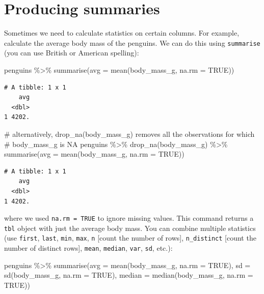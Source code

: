 \documentclass[
  letterpaper,
  DIV=11,
  numbers=noendperiod]{scrreprt}
\newenvironment{Shaded}{\begin{snugshade}}{\end{snugshade}}
\newcommand{\AttributeTok}[1]{\textcolor[rgb]{0.40,0.45,0.13}{#1}}
\newcommand{\CommentTok}[1]{\textcolor[rgb]{0.37,0.37,0.37}{#1}}
\newcommand{\ConstantTok}[1]{\textcolor[rgb]{0.56,0.35,0.01}{#1}}
\newcommand{\FunctionTok}[1]{\textcolor[rgb]{0.28,0.35,0.67}{#1}}
\newcommand{\NormalTok}[1]{\textcolor[rgb]{0.00,0.23,0.31}{#1}}
\newcommand{\SpecialCharTok}[1]{\textcolor[rgb]{0.37,0.37,0.37}{#1}}
\begin{document}
\hypertarget{producing-summaries}{%
\section{Producing summaries}\label{producing-summaries}}

Sometimes we need to calculate statistics on certain columns. For
example, calculate the average body mass of the penguins. We can do this
using \texttt{summarise} (you can use British or American spelling):

\begin{Shaded}
\begin{Highlighting}[]
\NormalTok{penguins }\SpecialCharTok{\%\textgreater{}\%} 
  \FunctionTok{summarise}\NormalTok{(}\AttributeTok{avg =} \FunctionTok{mean}\NormalTok{(body\_mass\_g, }\AttributeTok{na.rm =} \ConstantTok{TRUE}\NormalTok{))}
\end{Highlighting}
\end{Shaded}

\begin{verbatim}
# A tibble: 1 x 1
    avg
  <dbl>
1 4202.
\end{verbatim}

\begin{Shaded}
\begin{Highlighting}[]
\CommentTok{\# alternatively, drop\_na(body\_mass\_g) removes all the observations for which}
\CommentTok{\# body\_mass\_g is NA}
\NormalTok{penguins }\SpecialCharTok{\%\textgreater{}\%} 
  \FunctionTok{drop\_na}\NormalTok{(body\_mass\_g) }\SpecialCharTok{\%\textgreater{}\%} 
  \FunctionTok{summarise}\NormalTok{(}\AttributeTok{avg =} \FunctionTok{mean}\NormalTok{(body\_mass\_g, }\AttributeTok{na.rm =} \ConstantTok{TRUE}\NormalTok{))}
\end{Highlighting}
\end{Shaded}

\begin{verbatim}
# A tibble: 1 x 1
    avg
  <dbl>
1 4202.
\end{verbatim}

where we used \texttt{na.rm\ =\ TRUE} to ignore missing values. This
command returns a \texttt{tbl} object with just the average body mass.
You can combine multiple statistics (use \texttt{first}, \texttt{last},
\texttt{min}, \texttt{max}, \texttt{n} {[}count the number of rows{]},
\texttt{n\_distinct} {[}count the number of distinct rows{]},
\texttt{mean}, \texttt{median}, \texttt{var}, \texttt{sd}, etc.):

\begin{Shaded}
\begin{Highlighting}[]
\NormalTok{penguins }\SpecialCharTok{\%\textgreater{}\%} 
  \FunctionTok{summarise}\NormalTok{(}\AttributeTok{avg =} \FunctionTok{mean}\NormalTok{(body\_mass\_g, }\AttributeTok{na.rm =} \ConstantTok{TRUE}\NormalTok{), }
            \AttributeTok{sd =} \FunctionTok{sd}\NormalTok{(body\_mass\_g, }\AttributeTok{na.rm =} \ConstantTok{TRUE}\NormalTok{), }
            \AttributeTok{median =} \FunctionTok{median}\NormalTok{(body\_mass\_g, }\AttributeTok{na.rm =} \ConstantTok{TRUE}\NormalTok{))}
\end{Highlighting}
\end{Shaded}
\end{document}
